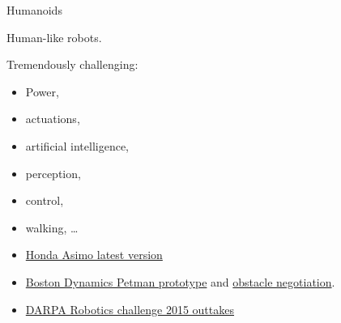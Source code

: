 \documentclass[compress]{beamer}
\begin{document}
{

\begin{frame}{Humanoids}

Human-like robots.

Tremendously challenging:

    \begin{itemize}
        \item Power, 
        \item actuations, 
        \item artificial intelligence, 
        \item perception, 
        \item control,
        \item walking, \ldots{}
    \end{itemize}


\begin{itemize}
\item
  \href{http://youtu.be/yND4k4NM0qU}{Honda Asimo latest version}
\item
  \href{http://youtu.be/aqCmX5dMYHg}{Boston Dynamics Petman prototype}
  and \href{http://youtu.be/FFGfq0pRczY}{obstacle negotiation}.
\item
  \href{https://www.youtube.com/watch?v=g0TaYhjpOfo}{DARPA Robotics
  challenge 2015 outtakes}
\end{itemize}

\end{frame}
}
\end{document}
